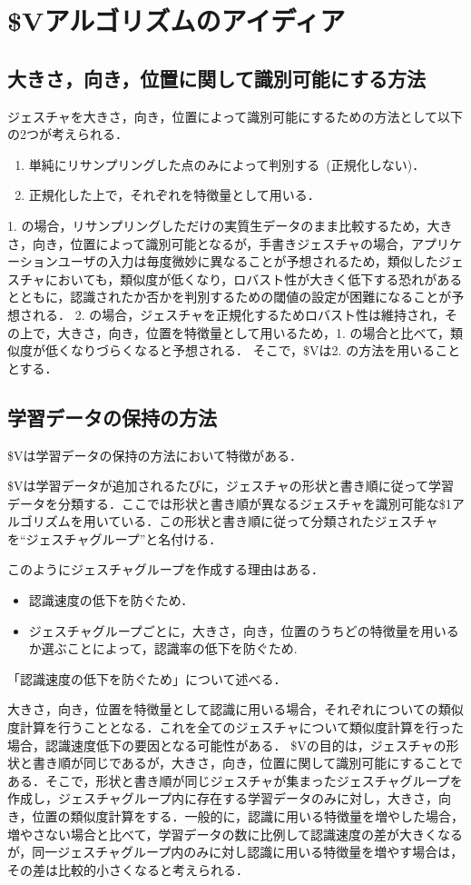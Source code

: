 \section{\$Vアルゴリズムのアイディア}

\subsection{大きさ，向き，位置に関して識別可能にする方法}
ジェスチャを大きさ，向き，位置によって識別可能にするための方法として以下の2つが考えられる．
\begin{enumerate}
\item 単純にリサンプリングした点のみによって判別する~(正規化しない)．
\item 正規化した上で，それぞれを特徴量として用いる．
\end{enumerate}
1. の場合，リサンプリングしただけの実質生データのまま比較するため，大きさ，向き，位置によって識別可能となるが，手書きジェスチャの場合，アプリケーションユーザの入力は毎度微妙に異なることが予想されるため，類似したジェスチャにおいても，類似度が低くなり，ロバスト性が大きく低下する恐れがあるとともに，認識されたか否かを判別するための閾値の設定が困難になることが予想される．
2. の場合，ジェスチャを正規化するためロバスト性は維持され，その上で，大きさ，向き，位置を特徴量として用いるため，1. の場合と比べて，類似度が低くなりづらくなると予想される．
そこで，\$Vは2. の方法を用いることとする．

\subsection{学習データの保持の方法}
\$Vは学習データの保持の方法において特徴がある．

\$Vは学習データが追加されるたびに，ジェスチャの形状と書き順に従って学習データを分類する．ここでは形状と書き順が異なるジェスチャを識別可能な\$1アルゴリズムを用いている．この形状と書き順に従って分類されたジェスチャを``ジェスチャグループ''と名付ける．

このようにジェスチャグループを作成する理由はある．
\begin{itemize}
\item 認識速度の低下を防ぐため．
\item ジェスチャグループごとに，大きさ，向き，位置のうちどの特徴量を用いるか選ぶことによって，認識率の低下を防ぐため.
\end{itemize}

「認識速度の低下を防ぐため」について述べる．

大きさ，向き，位置を特徴量として認識に用いる場合，それぞれについての類似度計算を行うこととなる．これを全てのジェスチャについて類似度計算を行った場合，認識速度低下の要因となる可能性がある．
\$Vの目的は，ジェスチャの形状と書き順が同じであるが，大きさ，向き，位置に関して識別可能にすることである．そこで，形状と書き順が同じジェスチャが集まったジェスチャグループを作成し，ジェスチャグループ内に存在する学習データのみに対し，大きさ，向き，位置の類似度計算をする．一般的に，認識に用いる特徴量を増やした場合，増やさない場合と比べて，学習データの数に比例して認識速度の差が大きくなるが，同一ジェスチャグループ内のみに対し認識に用いる特徴量を増やす場合は，その差は比較的小さくなると考えられる．

